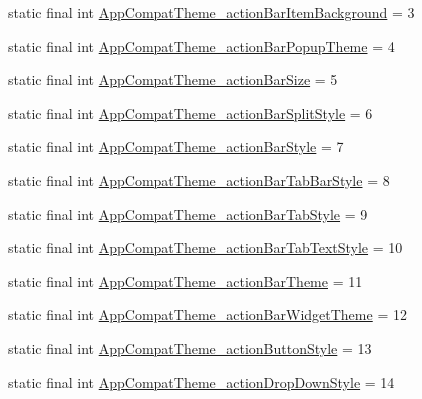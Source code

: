 \begin{DoxyCompactItemize}
static final int \mbox{\hyperlink{classandroid_1_1support_1_1design_1_1_r_1_1styleable_ab149188e28f3773ec75d040a249d5459}{App\+Compat\+Theme\+\_\+action\+Bar\+Item\+Background}} = 3
\item 
static final int \mbox{\hyperlink{classandroid_1_1support_1_1design_1_1_r_1_1styleable_a79a2c4ceb300b7facda280aac9831932}{App\+Compat\+Theme\+\_\+action\+Bar\+Popup\+Theme}} = 4
\item 
static final int \mbox{\hyperlink{classandroid_1_1support_1_1design_1_1_r_1_1styleable_ae77cb3f50624fd81e653c35d793cffb8}{App\+Compat\+Theme\+\_\+action\+Bar\+Size}} = 5
\item 
static final int \mbox{\hyperlink{classandroid_1_1support_1_1design_1_1_r_1_1styleable_ae5083d9c973cdfa9d72ebd78e750eff3}{App\+Compat\+Theme\+\_\+action\+Bar\+Split\+Style}} = 6
\item 
static final int \mbox{\hyperlink{classandroid_1_1support_1_1design_1_1_r_1_1styleable_a61cf339a7c5a42cf8b0bffddde821996}{App\+Compat\+Theme\+\_\+action\+Bar\+Style}} = 7
\item 
static final int \mbox{\hyperlink{classandroid_1_1support_1_1design_1_1_r_1_1styleable_a8a425f9bb1ba107a926a9904cfee276b}{App\+Compat\+Theme\+\_\+action\+Bar\+Tab\+Bar\+Style}} = 8
\item 
static final int \mbox{\hyperlink{classandroid_1_1support_1_1design_1_1_r_1_1styleable_a714a6063e752ee587e64fdeb3e0ec77c}{App\+Compat\+Theme\+\_\+action\+Bar\+Tab\+Style}} = 9
\item 
static final int \mbox{\hyperlink{classandroid_1_1support_1_1design_1_1_r_1_1styleable_a0fdd5eb64e3c53de499393a1d7cfa546}{App\+Compat\+Theme\+\_\+action\+Bar\+Tab\+Text\+Style}} = 10
\item 
static final int \mbox{\hyperlink{classandroid_1_1support_1_1design_1_1_r_1_1styleable_abeaccb570b04649912436a34512a7829}{App\+Compat\+Theme\+\_\+action\+Bar\+Theme}} = 11
\item 
static final int \mbox{\hyperlink{classandroid_1_1support_1_1design_1_1_r_1_1styleable_af39b7da92d56363d73839aba5c72d900}{App\+Compat\+Theme\+\_\+action\+Bar\+Widget\+Theme}} = 12
\item 
static final int \mbox{\hyperlink{classandroid_1_1support_1_1design_1_1_r_1_1styleable_a0255cf570084f384214980925721c0ff}{App\+Compat\+Theme\+\_\+action\+Button\+Style}} = 13
\item 
static final int \mbox{\hyperlink{classandroid_1_1support_1_1design_1_1_r_1_1styleable_a4e2cd4a980360108746ab21777611707}{App\+Compat\+Theme\+\_\+action\+Drop\+Down\+Style}} = 14

\end{DoxyCompactItemize}
